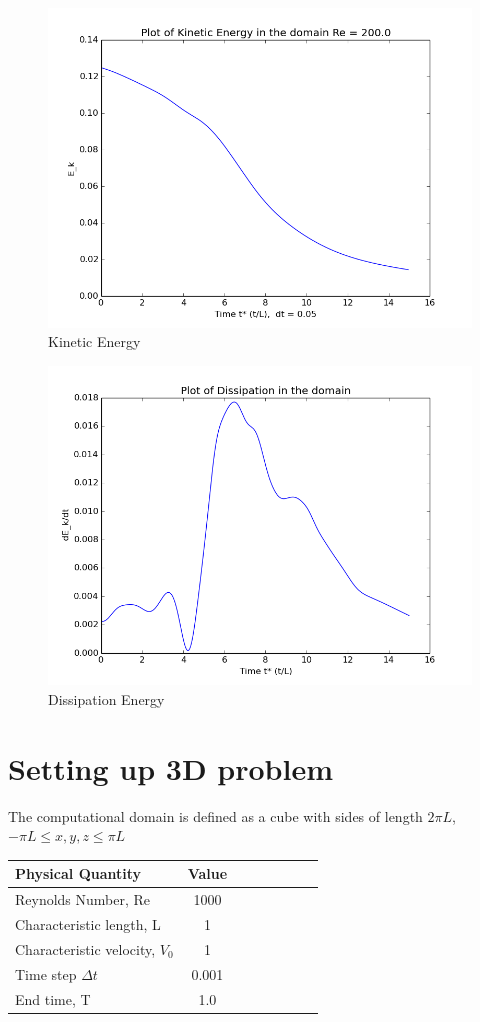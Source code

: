 \documentclass[a4paper,norsk]{article}
\begin{document}
\begin{figure}[h!]
	\centering
	\caption*{Kinetic Energy}
	\includegraphics[scale=0.6]{3D/Et.png}
\end{figure}

\begin{figure}[h!]
	\centering
	\caption*{Dissipation Energy}
	\includegraphics[scale=0.6]{3D/dissi.png}
\end{figure}

\section*{Setting up 3D problem}
The computational domain is defined as a cube with sides of length $2 \pi L$, $-\pi L \leq x,y,z \leq \pi L$

\begin{tabular}{l*{6}{c}r}
Physical Quantity              & Value  \\
\hline
Reynolds Number, Re & 1000   \\
Characteristic length, L           & 1     \\
Characteristic velocity, $V_{0}$   & 1     \\
Time step $\Delta t$ 			   & 0.001 \\
End time, T 					   & 1.0
\end{tabular}
\end{document}
